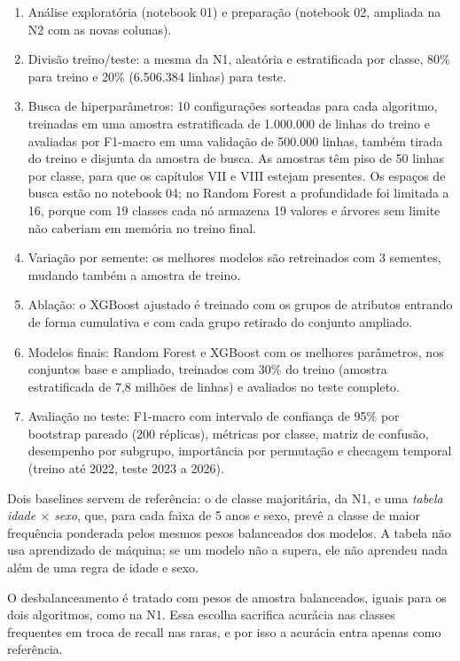 \documentclass[12pt]{article}
\begin{document}
\begin{enumerate}
  \item Análise exploratória (notebook 01) e preparação (notebook 02, ampliada na N2 com as novas colunas).
  \item Divisão treino/teste: a mesma da N1, aleatória e estratificada por classe, 80\% para treino e 20\% (6.506.384 linhas) para teste.
  \item Busca de hiperparâmetros: 10 configurações sorteadas para cada algoritmo, treinadas em uma amostra estratificada de 1.000.000 de linhas do treino e avaliadas por F1-macro em uma validação de 500.000 linhas, também tirada do treino e disjunta da amostra de busca. As amostras têm piso de 50 linhas por classe, para que os capítulos VII e VIII estejam presentes. Os espaços de busca estão no notebook 04; no Random Forest a profundidade foi limitada a 16, porque com 19 classes cada nó armazena 19 valores e árvores sem limite não caberiam em memória no treino final.
  \item Variação por semente: os melhores modelos são retreinados com 3 sementes, mudando também a amostra de treino.
  \item Ablação: o XGBoost ajustado é treinado com os grupos de atributos entrando de forma cumulativa e com cada grupo retirado do conjunto ampliado.
  \item Modelos finais: Random Forest e XGBoost com os melhores parâmetros, nos conjuntos base e ampliado, treinados com 30\% do treino (amostra estratificada de 7,8 milhões de linhas) e avaliados no teste completo.
  \item Avaliação no teste: F1-macro com intervalo de confiança de 95\% por bootstrap pareado (200 réplicas), métricas por classe, matriz de confusão, desempenho por subgrupo, importância por permutação e checagem temporal (treino até 2022, teste 2023 a 2026).
\end{enumerate}

Dois baselines servem de referência: o de classe majoritária, da N1, e uma \emph{tabela idade $\times$ sexo}, que, para cada faixa de 5 anos e sexo, prevê a classe de maior frequência ponderada pelos mesmos pesos balanceados dos modelos. A tabela não usa aprendizado de máquina; se um modelo não a supera, ele não aprendeu nada além de uma regra de idade e sexo.

O desbalanceamento é tratado com pesos de amostra balanceados, iguais para os dois algoritmos, como na N1. Essa escolha sacrifica acurácia nas classes frequentes em troca de recall nas raras, e por isso a acurácia entra apenas como referência.
\end{document}
